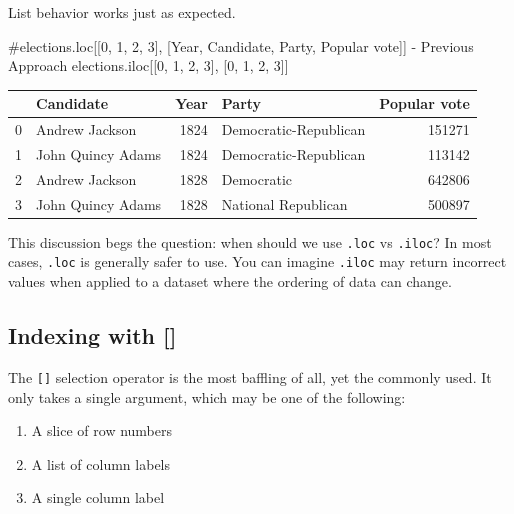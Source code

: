 \documentclass[
  letterpaper,
  DIV=11,
  numbers=noendperiod]{scrreprt}
\newenvironment{Shaded}{\begin{snugshade}}{\end{snugshade}}
\newcommand{\CommentTok}[1]{\textcolor[rgb]{0.37,0.37,0.37}{#1}}
\newcommand{\DecValTok}[1]{\textcolor[rgb]{0.68,0.00,0.00}{#1}}
\newcommand{\NormalTok}[1]{\textcolor[rgb]{0.00,0.23,0.31}{#1}}
\providecommand{\tightlist}{%
  \setlength{\itemsep}{0pt}\setlength{\parskip}{0pt}}\usepackage{longtable,booktabs,array}
\begin{document}
List behavior works just as expected.

\begin{Shaded}
\begin{Highlighting}[]
\CommentTok{\#elections.loc[[0, 1, 2, 3], [\textquotesingle{}Year\textquotesingle{}, \textquotesingle{}Candidate\textquotesingle{}, \textquotesingle{}Party\textquotesingle{}, \textquotesingle{}Popular vote\textquotesingle{}]] {-} Previous Approach}
\NormalTok{elections.iloc[[}\DecValTok{0}\NormalTok{, }\DecValTok{1}\NormalTok{, }\DecValTok{2}\NormalTok{, }\DecValTok{3}\NormalTok{], [}\DecValTok{0}\NormalTok{, }\DecValTok{1}\NormalTok{, }\DecValTok{2}\NormalTok{, }\DecValTok{3}\NormalTok{]]}
\end{Highlighting}
\end{Shaded}

\begin{tabular}{llrlr}
\toprule
{} &          Candidate &  Year &                  Party &  Popular vote \\
\midrule
0 &     Andrew Jackson &  1824 &  Democratic-Republican &        151271 \\
1 &  John Quincy Adams &  1824 &  Democratic-Republican &        113142 \\
2 &     Andrew Jackson &  1828 &             Democratic &        642806 \\
3 &  John Quincy Adams &  1828 &    National Republican &        500897 \\
\bottomrule
\end{tabular}

This discussion begs the question: when should we use \texttt{.loc} vs
\texttt{.iloc}? In most cases, \texttt{.loc} is generally safer to use.
You can imagine \texttt{.iloc} may return incorrect values when applied
to a dataset where the ordering of data can change.

\hypertarget{indexing-with}{%
\subsection{Indexing with {[}{]}}\label{indexing-with}}

The \texttt{{[}{]}} selection operator is the most baffling of all, yet
the commonly used. It only takes a single argument, which may be one of
the following:

\begin{enumerate}
\def\labelenumi{\arabic{enumi}.}
\tightlist
\item
  A slice of row numbers
\item
  A list of column labels
\item
  A single column label
\end{enumerate}
\end{document}
